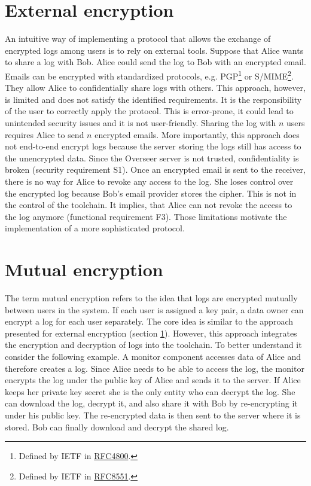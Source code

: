 \documentclass[../main.tex]{subfiles}
\begin{document}
\section{External encryption}
\label{sec:external-encryption}
An intuitive way of implementing a protocol that allows the exchange of encrypted logs among users is to rely on external tools.
Suppose that Alice wants to share a log with Bob.
Alice could send the log to Bob with an encrypted email.
Emails can be encrypted with standardized protocols, e.g. PGP\footnote{Defined by IETF in \href{https://www.rfc-editor.org/rfc/rfc4880}{RFC4800}.} or S/MIME\footnote{Defined by IETF in \href{https://www.rfc-editor.org/rfc/rfc8551.html}{RFC8551}.}.
They allow Alice to confidentially share logs with others.
This approach, however, is limited and does not satisfy the identified requirements.
It is the responsibility of the user to correctly apply the protocol.
This is error-prone, it could lead to unintended security issues and it is not user-friendly.
Sharing the log with $n$ users requires Alice to send $n$ encrypted emails.
More importantly, this approach does not end-to-end encrypt logs because the server storing the logs still has access to the unencrypted data.
Since the Overseer server is not trusted, confidentiality is broken (security requirement S1).
Once an encrypted email is sent to the receiver, there is no way for Alice to revoke any access to the log.
She loses control over the encrypted log because Bob's email provider stores the cipher.
This is not in the control of the toolchain.
It implies, that Alice can not revoke the access to the log anymore (functional requirement F3).
Those limitations motivate the implementation of a more sophisticated protocol.

\section{Mutual encryption}
\label{sec:mutual-encryption}
The term mutual encryption refers to the idea that logs are encrypted mutually between users in the system.
If each user is assigned a key pair, a data owner can encrypt a log for each user separately.
The core idea is similar to the approach presented for external encryption (section \ref{sec:external-encryption}).
However, this approach integrates the encryption and decryption of logs into the toolchain.
To better understand it consider the following example.
A monitor component accesses data of Alice and therefore creates a log.
Since Alice needs to be able to access the log, the monitor encrypts the log under the public key of Alice and sends it to the server.
If Alice keeps her private key secret she is the only entity who can decrypt the log.
She can download the log, decrypt it, and also share it with Bob by re-encrypting it under his public key.
The re-encrypted data is then sent to the server where it is stored.
Bob can finally download and decrypt the shared log.
\end{document}
